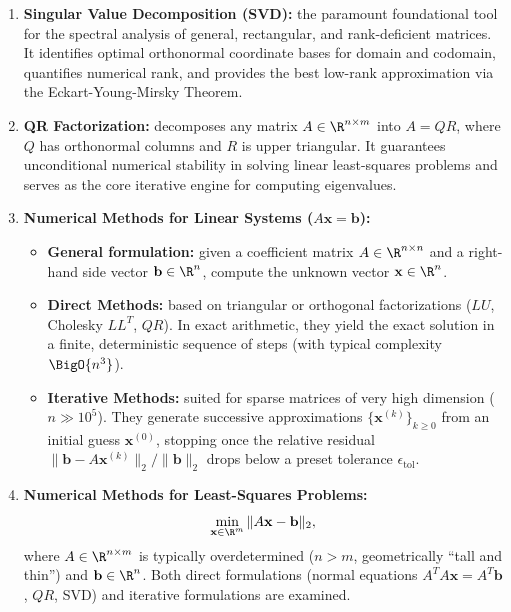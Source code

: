 \begin{enumerate}
    \item \textbf{Singular Value Decomposition (SVD):} the paramount foundational tool for the spectral analysis of general, rectangular, and rank-deficient matrices. It identifies optimal orthonormal coordinate bases for domain and codomain, quantifies numerical rank, and provides the best low-rank approximation via the Eckart-Young-Mirsky Theorem.

    \item \textbf{QR Factorization:} decomposes any matrix $A \in \R^{n \times m}$ into $A = QR$, where $Q$ has orthonormal columns and $R$ is upper triangular. It guarantees unconditional numerical stability in solving linear least-squares problems and serves as the core iterative engine for computing eigenvalues.

    \item \textbf{Numerical Methods for Linear Systems ($A\mathbf{x} = \mathbf{b}$):}
    \begin{itemize}
        \item \textbf{General formulation:} given a coefficient matrix $A \in \R^{n \times n}$ and a right-hand side vector $\mathbf{b} \in \R^n$, compute the unknown vector $\mathbf{x} \in \R^n$.
        \item \textbf{Direct Methods:} based on triangular or orthogonal factorizations ($LU$, Cholesky $LL^T$, $QR$). In exact arithmetic, they yield the exact solution in a finite, deterministic sequence of steps (with typical complexity $\BigO{n^3}$).
        \item \textbf{Iterative Methods:} suited for sparse matrices of very high dimension ($n \gg 10^5$). They generate successive approximations $\{\mathbf{x}^{(k)}\}_{k \ge 0}$ from an initial guess $\mathbf{x}^{(0)}$, stopping once the relative residual $\|\mathbf{b} - A\mathbf{x}^{(k)}\|_2 / \|\mathbf{b}\|_2$ drops below a preset tolerance $\epsilon_{\text{tol}}$.
    \end{itemize}

    \item \textbf{Numerical Methods for Least-Squares Problems:}
    \begin{equation}
        \min_{\mathbf{x} \in \R^m} \|A\mathbf{x} - \mathbf{b}\|_2,
    \end{equation}
    where $A \in \R^{n \times m}$ is typically overdetermined ($n > m$, geometrically ``tall and thin'') and $\mathbf{b} \in \R^n$. Both direct formulations (normal equations $A^T A \mathbf{x} = A^T \mathbf{b}$, $QR$, SVD) and iterative formulations are examined.


\end{enumerate}
